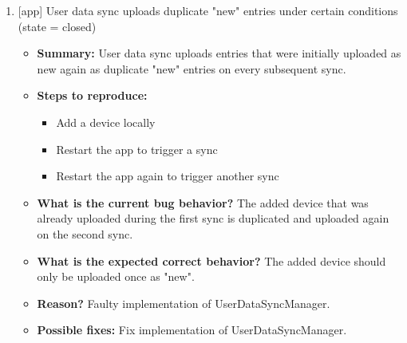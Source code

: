 \begin{enumerate}
\item {[app] User data sync uploads duplicate "new" entries under certain conditions (state = closed)}
\begin{itemize}	
	\item \textbf{Summary: } User data sync uploads entries that were initially uploaded as new again as duplicate "new" entries on every subsequent sync.\\
	\item \textbf{Steps to reproduce: }
	\begin{itemize}
		\item Add a device locally\\
		\item Restart the app to trigger a sync\\
		\item Restart the app again to trigger another sync\\
	\end{itemize}
	\item \textbf{What is the current bug behavior? }The added device that was already uploaded during the first sync is duplicated and uploaded again on the second sync.\\
	\item \textbf{What is the expected correct behavior? }The added device should only be uploaded once as "new".\\
	\item \textbf{Reason? }Faulty implementation of UserDataSyncManager.\\
	\item \textbf{Possible fixes: }Fix implementation of UserDataSyncManager.\\
\end{itemize}



\end{enumerate}
